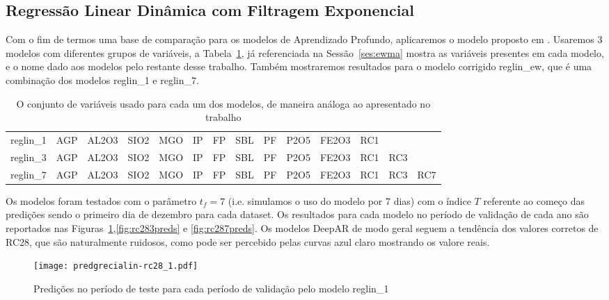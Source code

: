 \subsection{Regressão Linear Dinâmica com Filtragem Exponencial}

Com o fim de termos uma base de comparação para os modelos de
Aprendizado Profundo, aplicaremos o modelo proposto em \citep{grecialin}.
Usaremos 3 modelos com diferentes grupos de variáveis, a
Tabela~\ref{tab:modelslin}, já referenciada na Sessão~\ref{ses:ewma} mostra
as variáveis presentes em cada modelo, e o nome dado aos modelos pelo restante
desse trabalho. Também mostraremos resultados para o modelo corrigido
reglin\_ew, que é uma combinação dos modelos reglin\_1 e reglin\_7.


\begin{table}[]
\centering 
\begin{tabular}{llllllllllllll}
\toprule
reglin\_1 &  AGP &  AL2O3 &  SIO2 &  MGO &  IP &  FP &  SBL &  PF &  P2O5 &  FE2O3 &  RC1 &      &      \\
reglin\_3 &  AGP &  AL2O3 &  SIO2 &  MGO &  IP &  FP &  SBL &  PF &  P2O5 &  FE2O3 &  RC1 &  RC3 &      \\
reglin\_7 &  AGP &  AL2O3 &  SIO2 &  MGO &  IP &  FP &  SBL &  PF &  P2O5 &  FE2O3 &  RC1 &  RC3 &  RC7 \\
\bottomrule
\end{tabular}
\caption{O conjunto de variáveis usado para cada um dos modelos, de maneira análoga ao apresentado no trabalho \cite{grecialin}}
\label{tab:modelslin}
\end{table}


Os modelos foram testados com o parâmetro $t_f = 7$ (i.e. simulamos o uso do
modelo por 7 dias) com o índice $T$ referente
ao começo das predições sendo o primeiro dia de dezembro para cada dataset.
Os resultados para cada modelo no período de validação de cada ano são
reportados nas Figuras~\ref{fig:rc281preds},\ref{fig:rc283preds} e
\ref{fig:rc287preds}. Os modelos DeepAR de modo geral seguem a tendência dos
valores corretos de RC28, que são naturalmente ruidosos, como pode ser
percebido pelas curvas azul claro mostrando os valore reais. 

\begin{figure}[H]
  \centering
  \texttt{[image: predgrecialin-rc28\_1.pdf]}
  \caption{Predições no período de teste para cada período de validação pelo
    modelo reglin\_1}
  \label{fig:rc281preds}
\end{figure}

